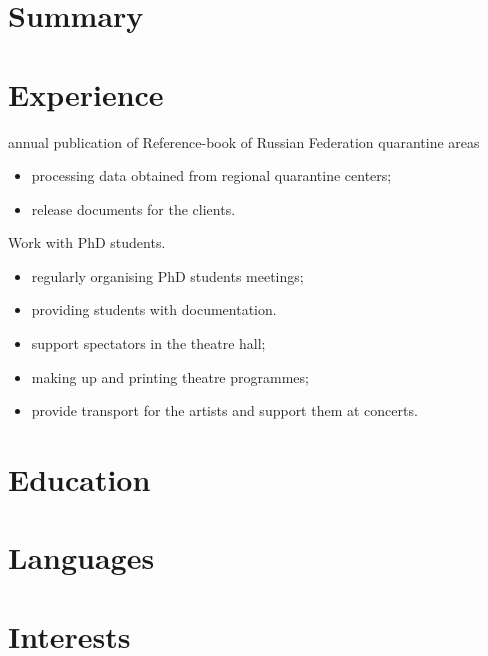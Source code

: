 \documentclass[11pt, a4paper]{moderncv}
\begin{document}
\makecvtitle



\section{Summary}





\section{Experience}

	{annual publication of Reference-book of Russian Federation quarantine areas
	\begin{itemize}
	\item processing data obtained from regional quarantine centers;
	\item release documents for the clients.
	\end{itemize}}

	{Work with PhD students.
	\begin{itemize}
	\item regularly organising PhD students meetings;
	\item providing students with documentation.
	\end{itemize}}

	{\begin{itemize}
	\item support spectators in the theatre hall;
	\item making up and printing theatre programmes;
	\item provide transport for the artists and support them at concerts.
	\end{itemize}}




\section{Education}




\section{Languages}





\section{Interests}

\end{document}
